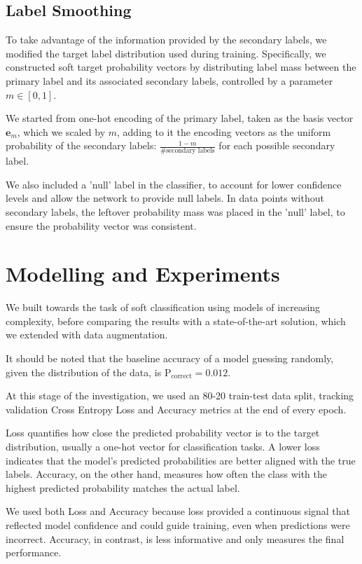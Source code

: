 \documentclass[10pt]{article}
\begin{document}
\subsection*{Label Smoothing}

To take advantage of the information provided by the secondary labels, we modified the target label distribution used during training. Specifically, we constructed soft target probability vectors by distributing label mass between the primary label and its associated secondary labels, controlled by a parameter $m \in [0,1]$.

We started from one-hot encoding of the primary label, taken as the basis vector $\mathbf{e}_m$, which we scaled by $m$, adding to it the encoding vectors as the uniform probability of the secondary labels: $\frac{1-m}{\#\text{secondary labels}}$ for each possible secondary label.

We also included a 'null' label in the classifier, to account for lower confidence levels and allow the network to provide null labels. In data points without secondary labels, the leftover probability mass was placed in the 'null' label, to ensure the probability vector was consistent.

\section*{Modelling and Experiments}

We built towards the task of soft classification using models of increasing complexity, before comparing the results with a state-of-the-art solution, which we extended with data augmentation.

It should be noted that the baseline accuracy of a model guessing randomly, given the distribution of the data, is $\text{P}_\text{correct} = 0.012$.

At this stage of the investigation, we used an 80-20 train-test data split, tracking validation Cross Entropy Loss and Accuracy metrics at the end of every epoch.

Loss quantifies how close the predicted probability vector is to the target distribution, usually a one-hot vector for classification tasks. A lower loss indicates that the model’s predicted probabilities are better aligned with the true labels. Accuracy, on the other hand, measures how often the class with the highest predicted probability matches the actual label.

We used both Loss and Accuracy because loss provided a continuous signal that reflected model confidence and could guide training, even when predictions were incorrect. Accuracy, in contrast, is less informative and only measures the final performance.
\end{document}
